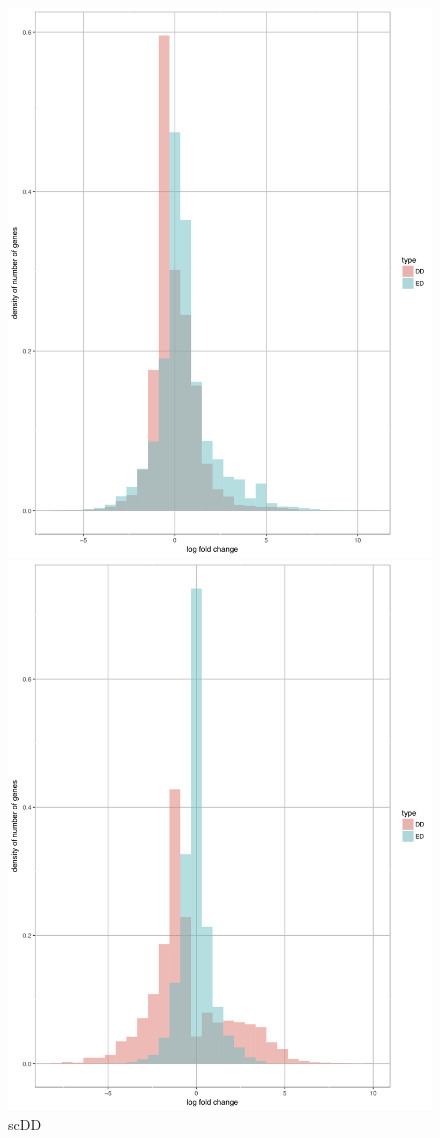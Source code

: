 \documentclass[11pt]{amsart}
\begin{document}
\begin{figure}[H]
  \includegraphics[width=\linewidth]{DEC_NPC_scdd.png}
  \caption{scDD}\label{fig:scDD}
\endminipage\hfill
{}
  \includegraphics[width=\linewidth]{DEC_NPC_scddb.png}

\end{figure}
\end{document}
